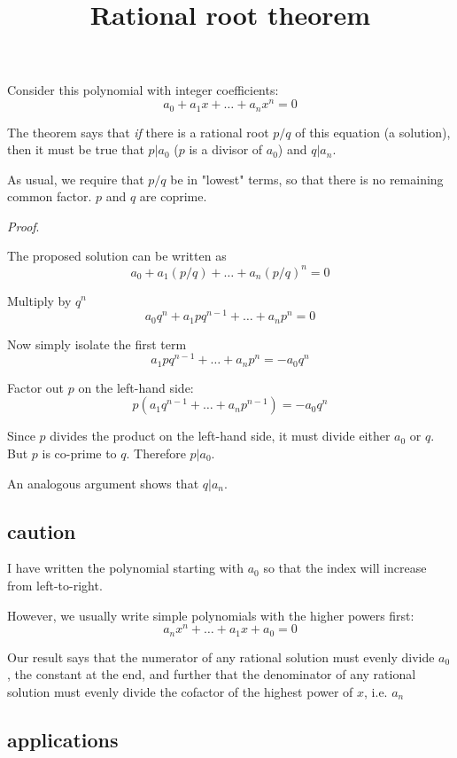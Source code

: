 \documentclass[11pt, oneside]{article}
\title{Rational root theorem}
\date{}
\begin{document}
\maketitle
\Large


Consider this polynomial with integer coefficients:
\[ a_0 + a_1 x + \dots + a_n x^n = 0 \]

The theorem says that \emph{if} there is a rational root $p/q$ of this equation (a solution), then it must be true that $p|a_0$ ($p$ is a divisor of $a_0$) and $q|a_n$.  

As usual, we require that $p/q$ be in "lowest" terms, so that there is no remaining common factor.  $p$ and $q$ are coprime.

\emph{Proof}.

The proposed solution can be written as
\[ a_0 + a_1 (p/q) + \dots + a_n (p/q)^n = 0 \]

Multiply by $q^n$
\[ a_0 q^n + a_1 p q^{n-1} + \dots + a_n p^n = 0 \]

Now simply isolate the first term
\[ a_1 p q^{n-1}  + \dots + a_n p^n = - a_0 q^n \]

Factor out $p$ on the left-hand side:
\[ p(a_1 q^{n-1} + \dots + a_n p^{n-1}) = - a_0 q^n \]

Since $p$ divides the product on the left-hand side, it must divide either $a_0$ or $q$.  But $p$ is co-prime to $q$.  Therefore $p|a_0$.

An analogous argument shows that $q|a_n$.

\subsection*{caution}
I have written the polynomial starting with $a_0$ so that the index will increase from left-to-right.

However, we usually write simple polynomials with the higher powers first:
\[ a_n x^n + \dots + a_1 x + a_0 = 0 \]

Our result says that the numerator of any rational solution must evenly divide $a_0$, the constant at the end, and further that the denominator of any rational solution must evenly divide the cofactor of the highest power of $x$, i.e. $a_n$

\subsection*{applications}
\end{document}
